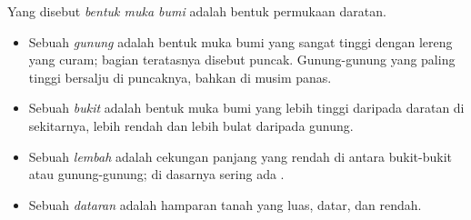 \begin{definition}\label{def:g1:landscapes-around-us:landform}
Yang disebut \emph{bentuk muka bumi} adalah bentuk
permukaan daratan.
\begin{itemize}
  \item Sebuah \emph{gunung} adalah bentuk muka bumi yang sangat
        tinggi dengan lereng yang curam; bagian teratasnya disebut puncak.
        Gunung-gunung yang paling tinggi bersalju di puncaknya, bahkan di
        musim panas.
  \item Sebuah \emph{bukit} adalah bentuk muka bumi yang lebih
        tinggi daripada daratan di sekitarnya, lebih rendah dan lebih
        bulat daripada gunung.
  \item Sebuah \emph{lembah} adalah cekungan panjang yang
        rendah di antara bukit-bukit atau gunung-gunung; di dasarnya sering
        ada .
  \item Sebuah \emph{dataran} adalah hamparan tanah yang luas,
        datar, dan rendah.
\end{itemize}
\end{definition}

